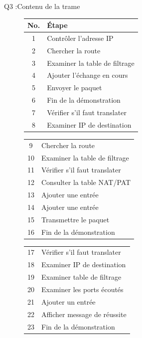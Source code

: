 \documentclass[11pt, openright]{book}
\begin{document}
\begin{dent}{Q3 :}Contenu de la trame
	
	\begin{figure}[ht!]
		\begin{tabular}{|c|l|}
			\hline
			No. & Étape                         \\
			\hline
			1   & Contrôler l'adresse IP        \\
			2   & Chercher la route             \\
			3   & Examiner la table de filtrage \\
			4   & Ajouter l'échange en cours    \\
			5   & Envoyer le paquet             \\
			6   & Fin de la démonstration       \\
			7   & Vérifier s'il faut translater \\
			8   & Examiner IP de destination    \\
		\end{tabular}
		\begin{tabular}{|c|l|}
			9  & Chercher la route             \\
			10 & Examiner la table de filtrage \\
			11 & Vérifier s'il faut translater \\
			12 & Consulter la table NAT/PAT    \\
			13 & Ajouter une entrée            \\
			14 & Ajouter une entrée            \\
			15 & Transmettre le paquet         \\
			16 & Fin de la démonstration       \\
		\end{tabular}
		\begin{tabular}{|c|l|}
			17 & Vérifier s'il faut translater \\
			18 & Examiner IP de destination    \\
			19 & Examiner table de filtrage    \\
			20 & Examiner les ports écoutés    \\
			21 & Ajouter un entrée             \\
			22 & Afficher message de réussite  \\
			23 & Fin de la démonstration       \\
			\hline
		\end{tabular}
	\end{figure}
\end{dent}
\end{document}
